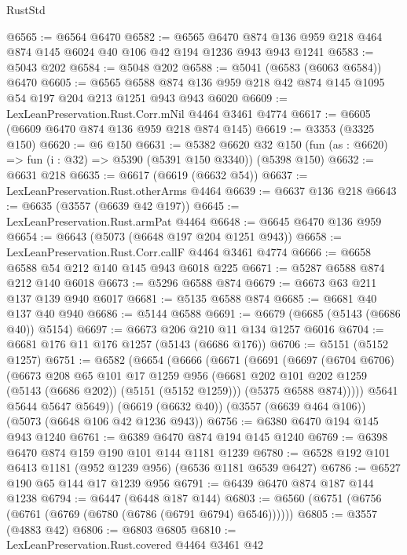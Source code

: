 \begin{lexlean}{RustStd}
\begin{coremodule}
@6565 := @6564 @6470
@6582 := @6565
    @6470
    @874
    @136
    @959
    @218
    @464
    @874
    @145
    @6024
    @40
    @106
    @42
    @194
    @1236
    @943
    @943
    @1241
@6583 := @5043 @202
@6584 := @5048 @202
@6588 := @5041 (@6583 (@6063 @6584)) @6470
@6605 := @6565
    @6588
    @874
    @136
    @959
    @218
    @42
    @874
    @145
    @1095
    @54
    @197
    @204
    @213
    @1251
    @943
    @943
    @6020
@6609 := LexLeanPreservation.Rust.Corr.mNil @4464 @3461 @4774
@6617 := @6605 (@6609 @6470 @874 @136 @959 @218 @874 @145)
@6619 := @3353 (@3325 @150)
@6620 := @6 @150
@6631 := @5382
    @6620
    @32
    @150
    (fun (as : @6620) => fun (i : @32) => @5390 (@5391 @150 @3340))
    (@5398 @150)
@6632 := @6631 @218
@6635 := @6617 (@6619 (@6632 @54))
@6637 := LexLeanPreservation.Rust.otherArms @4464
@6639 := @6637 @136 @218
@6643 := @6635 (@3557 (@6639 @42 @197))
@6645 := LexLeanPreservation.Rust.armPat @4464
@6648 := @6645 @6470 @136 @959
@6654 := @6643 (@5073 (@6648 @197 @204 @1251 @943))
@6658 := LexLeanPreservation.Rust.Corr.callF @4464 @3461 @4774
@6666 := @6658 @6588 @54 @212 @140 @145 @943 @6018 @225
@6671 := @5287 @6588 @874 @212 @140 @6018
@6673 := @5296 @6588 @874
@6679 := @6673 @63 @211 @137 @139 @940 @6017
@6681 := @5135 @6588 @874
@6685 := @6681 @40 @137 @40 @940
@6686 := @5144 @6588
@6691 := @6679 (@6685 (@5143 (@6686 @40)) @5154)
@6697 := @6673 @206 @210 @11 @134 @1257 @6016
@6704 := @6681 @176 @11 @176 @1257 (@5143 (@6686 @176))
@6706 := @5151 (@5152 @1257)
@6751 := @6582
    (@6654
      (@6666
        (@6671
          (@6691
            (@6697
              (@6704 @6706)
              (@6673
                @208
                @65
                @101
                @17
                @1259
                @956
                (@6681 @202 @101 @202 @1259 (@5143 (@6686 @202)) (@5151 (@5152 @1259)))
                (@5375 @6588 @874)))))
        @5641
        @5644
        @5647
        @5649))
    (@6619 (@6632 @40))
    (@3557 (@6639 @464 @106))
    (@5073 (@6648 @106 @42 @1236 @943))
@6756 := @6380 @6470 @194 @145 @943 @1240
@6761 := @6389 @6470 @874 @194 @145 @1240
@6769 := @6398 @6470 @874 @159 @190 @101 @144 @1181 @1239
@6780 := @6528 @192 @101 @6413 @1181 (@952 @1239 @956) (@6536 @1181 @6539 @6427)
@6786 := @6527 @190 @65 @144 @17 @1239 @956
@6791 := @6439 @6470 @874 @187 @144 @1238
@6794 := @6447 (@6448 @187 @144)
@6803 := @6560 (@6751 (@6756 (@6761 (@6769 (@6780 (@6786 (@6791 @6794) @6546))))))
@6805 := @3557 (@4883 @42)
@6806 := @6803 @6805
@6810 := LexLeanPreservation.Rust.covered @4464 @3461 @42

\end{coremodule}
\end{lexlean}
